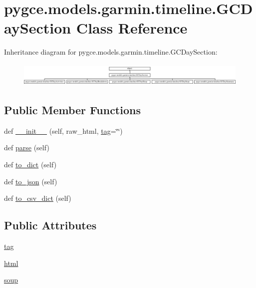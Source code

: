 \hypertarget{classpygce_1_1models_1_1garmin_1_1timeline_1_1_g_c_day_section}{}\section{pygce.\+models.\+garmin.\+timeline.\+G\+C\+Day\+Section Class Reference}
\label{classpygce_1_1models_1_1garmin_1_1timeline_1_1_g_c_day_section}
Inheritance diagram for pygce.\+models.\+garmin.\+timeline.\+G\+C\+Day\+Section\+:\begin{figure}[H]
\begin{center}
\leavevmode
\includegraphics[height=1.142857cm]{classpygce_1_1models_1_1garmin_1_1timeline_1_1_g_c_day_section}
\end{center}
\end{figure}
\subsection*{Public Member Functions}
\begin{DoxyCompactItemize}
\item 
def \hyperlink{classpygce_1_1models_1_1garmin_1_1timeline_1_1_g_c_day_section_aae8c8c4a74381fa4ee47881ad498fb8f}{\+\_\+\+\_\+init\+\_\+\+\_\+} (self, raw\+\_\+html, \hyperlink{classpygce_1_1models_1_1garmin_1_1timeline_1_1_g_c_day_section_a3dacbeacfedec2f69dcbb9fe6870f8a3}{tag}=\char`\"{}\char`\"{})
\item 
def \hyperlink{classpygce_1_1models_1_1garmin_1_1timeline_1_1_g_c_day_section_ac1ddb2f5379e356e93166d1ea934b9c9}{parse} (self)
\item 
def \hyperlink{classpygce_1_1models_1_1garmin_1_1timeline_1_1_g_c_day_section_adf3f25be05c84b2fc99d22cb5014e68d}{to\+\_\+dict} (self)
\item 
def \hyperlink{classpygce_1_1models_1_1garmin_1_1timeline_1_1_g_c_day_section_a810c65491986e687542ee5a4f02c51d7}{to\+\_\+json} (self)
\item 
def \hyperlink{classpygce_1_1models_1_1garmin_1_1timeline_1_1_g_c_day_section_a3a8d885a0155c9fa13843609fb7bf80d}{to\+\_\+csv\+\_\+dict} (self)
\end{DoxyCompactItemize}
\subsection*{Public Attributes}
\begin{DoxyCompactItemize}
\item 
\hyperlink{classpygce_1_1models_1_1garmin_1_1timeline_1_1_g_c_day_section_a3dacbeacfedec2f69dcbb9fe6870f8a3}{tag}
\item 
\hyperlink{classpygce_1_1models_1_1garmin_1_1timeline_1_1_g_c_day_section_ac70b12b38ec07c1afbd3198a2620fe86}{html}
\item 
\hyperlink{classpygce_1_1models_1_1garmin_1_1timeline_1_1_g_c_day_section_ae04dcff466d78ae686dce462057260a9}{soup}
\end{DoxyCompactItemize}


